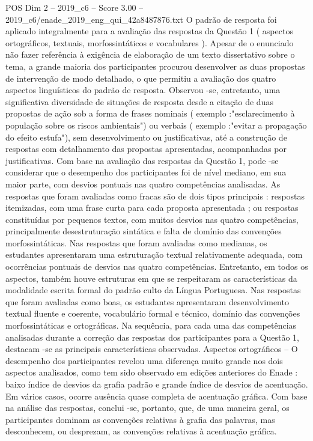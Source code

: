 \begin{textsample}{POS Dim 2 – 2019\_c6 – Score 3.00 – 2019\_c6/enade\_2019\_eng\_qui\_42a8487876.txt}
O padrão de resposta foi aplicado integralmente para a avaliação das respostas da Questão 1 ( aspectos ortográficos, textuais, morfossintáticos e vocabulares ).
Apesar de o enunciado não fazer referência à exigência de elaboração de um texto dissertativo sobre o tema, a grande maioria dos participantes procurou desenvolver as duas propostas de intervenção de modo detalhado, o que permitiu a avaliação dos quatro aspectos linguísticos do padrão de resposta.
Observou -se, entretanto, uma significativa diversidade de situações de resposta desde a citação de duas propostas de ação sob a forma de frases nominais ( exemplo :"esclarecimento à população sobre os riscos ambientais") ou verbais ( exemplo :"evitar a propagação do efeito estufa"), sem desenvolvimento ou justificativas, até a construção de respostas com detalhamento das propostas apresentadas, acompanhadas por justificativas.
Com base na avaliação das respostas da Questão 1, pode -se considerar que o desempenho dos participantes foi de nível mediano, em sua maior parte, com desvios pontuais nas quatro competências analisadas.
As respostas que foram avaliadas como fracas são de dois tipos principais : respostas itemizadas, com uma frase curta para cada proposta apresentada ; ou respostas constituídas por pequenos textos, com muitos desvios nas quatro competências, principalmente desestruturação sintática e falta de domínio das convenções morfossintáticas.
Nas respostas que foram avaliadas como medianas, os estudantes apresentaram uma estruturação textual relativamente adequada, com ocorrências pontuais de desvios nas quatro competências.
Entretanto, em todos os aspectos, também houve estruturas em que se respeitaram as características da modalidade escrita formal do padrão culto da Língua Portuguesa.
Nas respostas que foram avaliadas como boas, os estudantes apresentaram desenvolvimento textual fluente e coerente, vocabulário formal e técnico, domínio das convenções morfossintáticas e ortográficas.
Na sequência, para cada uma das competências analisadas durante a correção das respostas dos participantes para a Questão 1, destacam -se as principais características observadas.
Aspectos ortográficos – O desempenho dos participantes revelou uma diferença muito grande nos dois aspectos analisados, como tem sido observado em edições anteriores do Enade : baixo índice de desvios da grafia padrão e grande índice de desvios de acentuação.
Em vários casos, ocorre ausência quase completa de acentuação gráfica.
Com base na análise das respostas, conclui -se, portanto, que, de uma maneira geral, os participantes dominam as convenções relativas à grafia das palavras, mas desconhecem, ou desprezam, as convenções relativas à acentuação gráfica.

\end{textsample}
